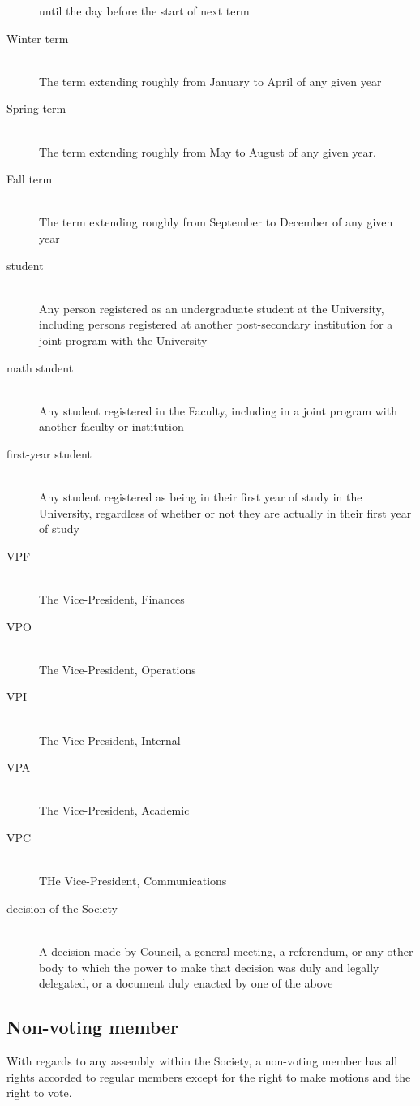 \begin{description}
  until the day before the start of next term
\item[Winter term]\hfill\\
  The term extending roughly from January to April of any given year
\item[Spring term]\hfill\\
  The term extending roughly from May to August of any given year.
\item[Fall term]\hfill\\
  The term extending roughly from September to December of any given year
\item[student]\hfill\\
  Any person registered as an undergraduate student at the University, including
  persons registered at another post-secondary institution for a joint program
  with the University
\item[math student]\hfill\\
  Any student registered in the Faculty, including in a joint program with
  another faculty or institution
\item[first-year student]\hfill\\
  Any student registered as being in their first year of study in the
  University, regardless of whether or not they are actually in their first year
  of study
\item[VPF]\hfill\\
  The Vice-President, Finances
\item[VPO]\hfill\\
  The Vice-President, Operations
\item[VPI]\hfill\\
  The Vice-President, Internal
\item[VPA]\hfill\\
  The Vice-President, Academic
\item[VPC]\hfill\\
  THe Vice-President, Communications
\item[decision of the Society]\hfill\\
  A decision made by Council, a general meeting, a referendum, or any other body
  to which the power to make that decision was duly and legally delegated, or a
  document duly enacted by one of the above
\end{description}

\subsection{Non-voting member}
With regards to any assembly within the Society, a non-voting member has all
rights accorded to regular members except for the right to make motions and
the right to vote.

